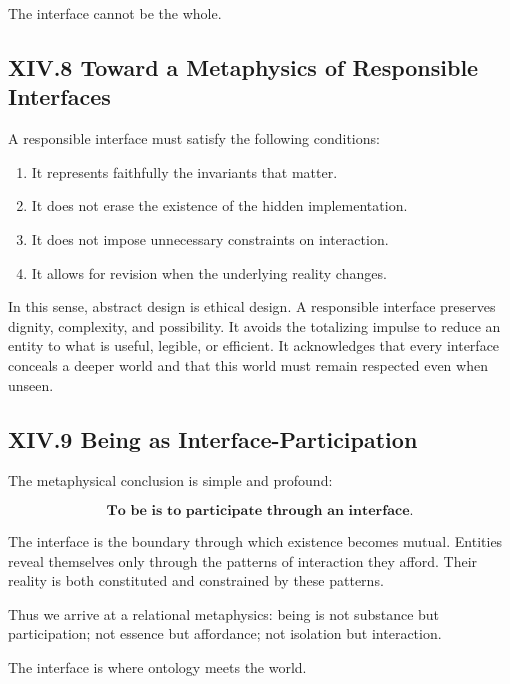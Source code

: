 \documentclass[11pt,letterpaper]{article}
\begin{document}
The interface cannot be the whole.

\subsection{XIV.8 Toward a Metaphysics of Responsible Interfaces}

A responsible interface must satisfy the following conditions:

\begin{enumerate}
    \item It represents faithfully the invariants that matter.
    \item It does not erase the existence of the hidden implementation.
    \item It does not impose unnecessary constraints on interaction.
    \item It allows for revision when the underlying reality changes.
\end{enumerate}

In this sense, abstract design is ethical design. A responsible interface preserves dignity, complexity, and possibility. It avoids the totalizing impulse to reduce an entity to what is useful, legible, or efficient. It acknowledges that every interface conceals a deeper world and that this world must remain respected even when unseen.

\subsection{XIV.9 Being as Interface-Participation}

The metaphysical conclusion is simple and profound:

\[
\textbf{To be is to participate through an interface.}
\]

The interface is the boundary through which existence becomes mutual. Entities reveal themselves only through the patterns of interaction they afford. Their reality is both constituted and constrained by these patterns.

Thus we arrive at a relational metaphysics: being is not substance but participation; not essence but affordance; not isolation but interaction.

The interface is where ontology meets the world.
\end{document}
